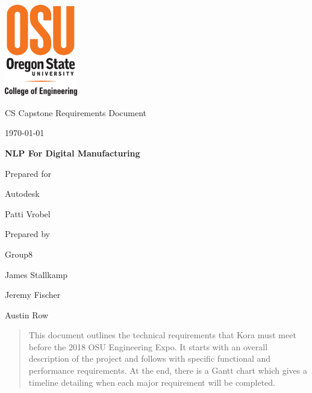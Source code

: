 \documentclass[onecolumn, draftclsnofoot,10pt, compsoc]{IEEEtran}
\def \CapstoneTeamName{\textbf{Insert Team Name Here} }
\def \CapstoneTeamNumber{8}
\def \GroupMemberOne{James Stallkamp}
\def \GroupMemberTwo{Jeremy Fischer}
\def \GroupMemberThree{Austin Row}
\def \CapstoneProjectName{NLP For Digital Manufacturing}
\def \CapstoneSponsorCompany{Autodesk}
\def \CapstoneSponsorPerson{Patti Vrobel}
\def \botname{Kora\xspace}
\def \DocType{		%
				Requirements Document
				}
\newcommand{\NameSigPair}[1]{\par
\makebox[2.75in][r]{#1} \hfil 	\makebox[3.25in]{\makebox[2.25in]{\hrulefill} \hfill		\makebox[.75in]{\hrulefill}}
\par\vspace{-12pt} \textit{\tiny\noindent
\makebox[2.75in]{} \hfil		\makebox[3.25in]{\makebox[2.25in][r]{Signature} \hfill	\makebox[.75in][r]{Date}}}}
\renewcommand{\NameSigPair}[1]{#1}
\begin{document}
\begin{titlepage}
    \begin{singlespace}
    	\includegraphics[height=4cm]{coe_v_spot1}
        \par\vspace{.2in}
        \centering
        \scshape{
            \huge CS Capstone \DocType \par
            {\large\today}\par
            \vspace{.5in}
            \textbf{\Huge\CapstoneProjectName}\par
            \vfill
            {\large Prepared for}\par
            \Huge \CapstoneSponsorCompany\par
            \vspace{5pt}
            {\Large\NameSigPair{\CapstoneSponsorPerson}\par}
            {\large Prepared by }\par
            Group\CapstoneTeamNumber\par
            \vspace{5pt}
            {\Large
                \NameSigPair{\GroupMemberOne}\par
                \NameSigPair{\GroupMemberTwo}\par
                \NameSigPair{\GroupMemberThree}\par
            }
            \vspace{20pt}
        }
        \begin{abstract}
       		This document outlines the technical requirements that \botname must meet before the 2018 OSU Engineering Expo. 
            It starts with an overall description of the project and follows with specific functional and performance requirements.
            At the end, there is a Gantt chart which gives a timeline detailing when each major requirement will be completed.
        \end{abstract}     
    \end{singlespace}
\end{titlepage}
\newpage
{}
\tableofcontents
\clearpage
\end{document}
